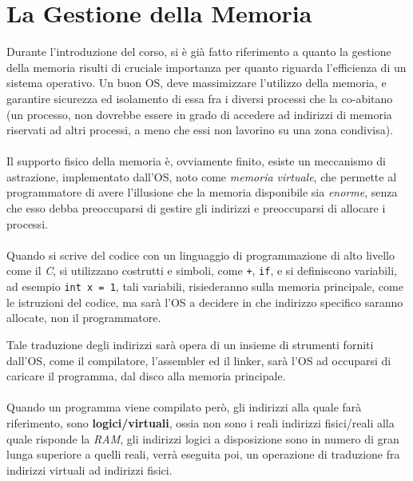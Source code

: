 \documentclass[12pt, letterpaper]{article}
\newcommand{\code}[1]{\colorbox{light-gray}{\texttt{#1}}}
\newcommand{\acc}{\\\hphantom{}\\}
\begin{document}
\section{La Gestione della Memoria}
Durante l'introduzione del corso, si è già fatto riferimento a quanto la gestione della memoria risulti di cruciale 
importanza per quanto riguarda l'efficienza di un sistema operativo. Un buon OS, deve massimizzare l'utilizzo della 
memoria, e garantire sicurezza ed isolamento di essa fra i diversi processi che la co-abitano (un processo, non 
dovrebbe essere in grado di accedere ad indirizzi di memoria riservati ad altri processi, a meno che essi non lavorino 
su una zona condivisa).\acc 
Il supporto fisico della memoria è, ovviamente finito, esiste un meccanismo di astrazione, implementato 
dall'OS, noto come \textit{memoria virtuale}, che permette al programmatore di avere l'illusione che la memoria 
disponibile sia \textit{enorme}, senza che esso debba preoccuparsi di gestire gli indirizzi e preoccuparsi di 
allocare i processi.\acc 
Quando si scrive del codice con un linguaggio di programmazione di alto livello come il \textit{C}, si utilizzano 
costrutti e simboli, come \code{+}, \code{if}, e si definiscono variabili, ad esempio \code{int x = 1}, tali variabili, 
risiederanno sulla memoria principale, come le istruzioni del codice, ma sarà l'OS a decidere in che indirizzo specifico saranno allocate, non il 
programmatore.

Tale traduzione degli indirizzi sarà opera di un insieme di strumenti forniti dall'OS, come il compilatore, l'assembler 
ed il linker, sarà l'OS ad occuparsi di caricare il programma, dal disco alla memoria principale.\acc 
Quando un programma viene compilato però, gli indirizzi alla quale farà riferimento, sono \textbf{logici/virtuali}, ossia 
non sono i reali indirizzi fisici/reali alla quale risponde la \textit{RAM}, gli indirizzi logici a disposizione sono in numero di gran 
lunga superiore a quelli reali, verrà eseguita poi, un operazione di traduzione fra indirizzi virtuali ad indirizzi fisici.
\end{document}

